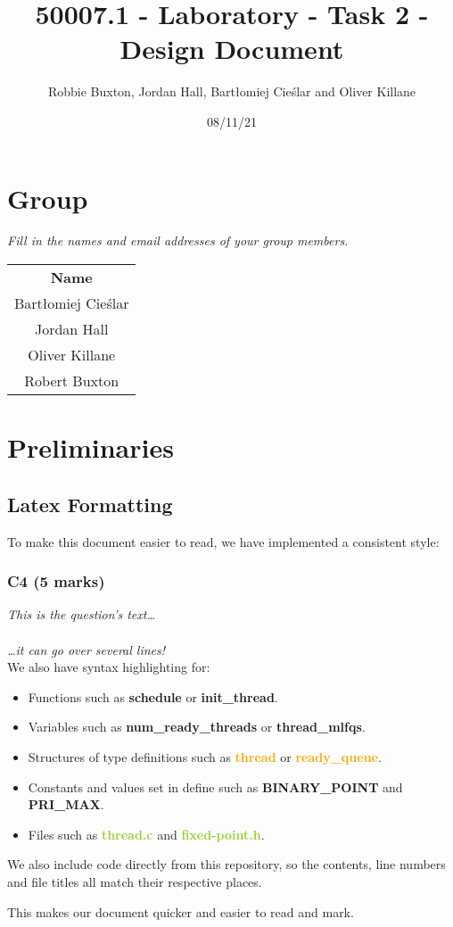 \documentclass{report}
\title{50007.1 - Laboratory - Task 2 - Design Document}
\author{Robbie Buxton, Jordan Hall, Bartłomiej Cieślar and Oliver Killane}
\date{08/11/21}
\newcommand{\question}[1]{\textit{#1} \ }
\newcommand{\fun}[1]{\textcolor{Emerald}{\textbf{#1}}}
\newcommand{\file}[1]{\textcolor{YellowGreen}{\textbf{#1}}}
\newcommand{\struct}[1]{\textcolor{orange}{\textbf{#1}}}
\newcommand{\var}[1]{\textcolor{RoyalPurple}{\textbf{#1}}}
\newcommand{\const}[1]{\textcolor{BrickRed}{\textbf{#1}}}
\newcommand{\pintoscode}[4]{}
\newcommand{\pintosfile}[3]{\pintoscode{#1}{#2}{\file{#3}}{#3}}
\begin{document}
    \maketitle

    \section*{Group}
        \question{Fill in the names and email addresses of your group members.}
        \begin{center}
			\begin{tabular}{c }
				\textbf{Name} \\
				Bartłomiej Cieślar \\
				Jordan Hall \\
				Oliver Killane \\
				Robert Buxton \\
			\end{tabular}
		\end{center}
    
    \section*{Preliminaries}
        \subsection*{Latex Formatting}
        To make this document easier to read, we have implemented a consistent style:
        \subsubsection*{C4 (5 marks)}
        \question{This is the question's text\dots
        \\
        \\ \dots it can go over several lines!}
        \\ We also have syntax highlighting for:
        \begin{itemize}
            \item Functions such as \fun{schedule} or \fun{init\_thread}.
            \item Variables such as \var{num\_ready\_threads} or \var{thread\_mlfqs}.
            \item Structures of type definitions such as \struct{thread} or \struct{ready\_queue}.
            \item Constants and values set in define such as \const{BINARY\_POINT} and \const{PRI\_MAX}.
            \item Files such as \file{thread.c} and \file{fixed-point.h}.
        \end{itemize}
        We also include code directly from this repository, so the contents, line numbers and file titles all match their respective places.
        \pintosfile{98}{110}{syscall.c}
        This makes our document quicker and easier to read and mark.
    
\end{document}
